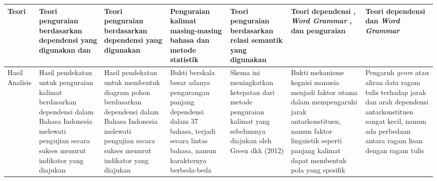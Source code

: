 \begin{landscape}
\begin{table}[htbp]
\begin{scriptsize}
\begin{center}
\begin{tabular}{| p{2cm} | p{3cm} | p{3cm} | p{3cm} | p{3cm} | p{3cm} | p{3cm} |}
Teori & Teori penguraian berdasarkan dependensi yang digunakan \cite{covington2001fundamental} dan \cite{nivre2004incrementality} & Teori penguraian berdasarkan dependensi yang digunakan \cite{nivre2006dependency} & Penguraian kalimat masing-masing bahasa dan metode statistik \cite{gelman2007data} & Teori penguraian berdasarkan relasi semantik yang digunakan \cite{nivre2006dependency} & Teori dependensi \cite{tesniere1959elements}, \textit{Word Grammar} \cite{hudson1984word}, dan penguraian \cite{nivre2006dependency} & Teori dependensi \cite{tesniere1959elements} dan \textit{Word Grammar} \cite{hudson1984word} \\ \hline
Hasil Analisis & Hasil pendekatan untuk penguraian kalimat berdasarkan dependensi dalam Bahasa Indonesia melewati pengujian secara sukses menurut indikator yang diajukan & Hasil pendekatan untuk membentuk diagram pohon berdasarkan dependensi dalam Bahasa Indonesia melewati pengujian secara sukses menurut indikator yang diajukan & Bukti berskala besar adanya pengurangan panjang dependensi dalam 37 bahasa, terjadi secara lintas bahasa, namun karakternya berbeda-beda & Skema ini meningkatkan ketepatan dari metode penguraian kalimat yang sebelumnya diajukan oleh Green dkk (2012) & Bukti mekanisme kognisi manusia menjadi faktor utama dalam mempengaruhi jarak antarkonstituen, namun faktor linguistik seperti panjang kalimat dapat membentuk pola yang spesifik & Pengaruh \textit{genre} atau aliran data ragam tulis terhadap jarak dan arah dependensi antarkonstituen sangat kecil, namun ada perbedaan antara ragam lisan dengan ragam tulis \\ \hline

\end{tabular}
\end{center}
\end{scriptsize}
\end{table} 
\end{landscape}
\pagestyle{plain}


